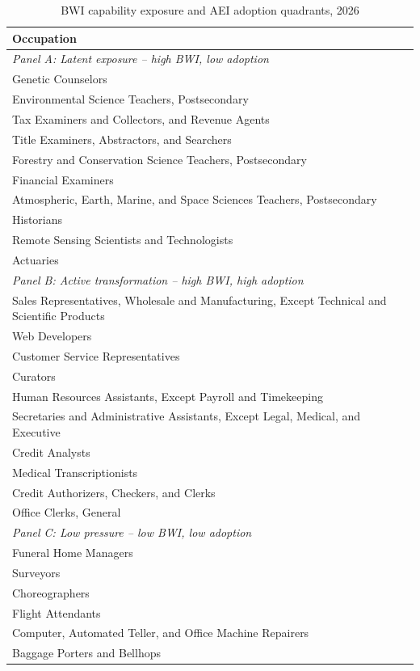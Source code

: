 \begin{table}[htbp]\centering
\caption{BWI capability exposure and AEI adoption quadrants, 2026}\label{tab:quadrants}
\begin{tabular}{l}\toprule
Occupation \\ \midrule
\textit{Panel A: Latent exposure -- high BWI, low adoption} \\
Genetic Counselors \\
Environmental Science Teachers, Postsecondary \\
Tax Examiners and Collectors, and Revenue Agents \\
Title Examiners, Abstractors, and Searchers \\
Forestry and Conservation Science Teachers, Postsecondary \\
Financial Examiners \\
Atmospheric, Earth, Marine, and Space Sciences Teachers, Postsecondary \\
Historians \\
Remote Sensing Scientists and Technologists \\
Actuaries \\
\textit{Panel B: Active transformation -- high BWI, high adoption} \\
Sales Representatives, Wholesale and Manufacturing, Except Technical and Scientific Products \\
Web Developers \\
Customer Service Representatives \\
Curators \\
Human Resources Assistants, Except Payroll and Timekeeping \\
Secretaries and Administrative Assistants, Except Legal, Medical, and Executive \\
Credit Analysts \\
Medical Transcriptionists \\
Credit Authorizers, Checkers, and Clerks \\
Office Clerks, General \\
\textit{Panel C: Low pressure -- low BWI, low adoption} \\
Funeral Home Managers \\
Surveyors \\
Choreographers \\
Flight Attendants \\
Computer, Automated Teller, and Office Machine Repairers \\
Baggage Porters and Bellhops \\

\end{tabular}
\end{table}
